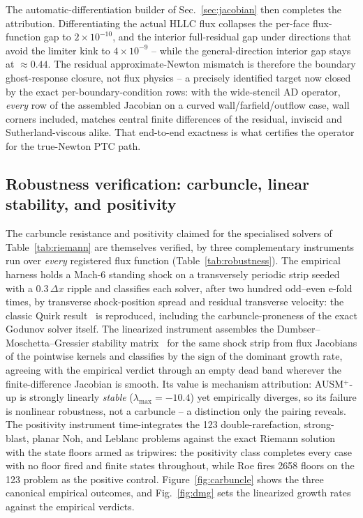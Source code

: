 \documentclass[journal,biblatex]{new-aiaa}
\begin{document}
The automatic-differentiation builder of Sec.~\ref{sec:jacobian} then completes the attribution. Differentiating the actual HLLC flux collapses the per-face flux-function gap to $2\times10^{-10}$, and the interior full-residual gap under directions that avoid the limiter kink to $4\times10^{-9}$ -- while the general-direction interior gap stays at $\approx0.44$. The residual approximate-Newton mismatch is therefore the boundary ghost-response closure, not flux physics -- a precisely identified target now closed by the exact per-boundary-condition rows: with the wide-stencil AD operator, \emph{every} row of the assembled Jacobian on a curved wall/farfield/outflow case, wall corners included, matches central finite differences of the residual, inviscid and Sutherland-viscous alike. That end-to-end exactness is what certifies the operator for the true-Newton PTC path.

\subsection{Robustness verification: carbuncle, linear stability, and positivity}
\label{sec:vv-robust}

The carbuncle resistance and positivity claimed for the specialised solvers of Table~\ref{tab:riemann} are themselves verified, by three complementary instruments run over \emph{every} registered flux function (Table~\ref{tab:robustness}). The empirical harness holds a Mach-6 standing shock on a transversely periodic strip seeded with a $0.3\,\Delta x$ ripple and classifies each solver, after two hundred odd--even e-fold times, by transverse shock-position spread and residual transverse velocity: the classic Quirk result~\cite{quirk_contribution_1994} is reproduced, including the carbuncle-proneness of the exact Godunov solver itself. The linearized instrument assembles the Dumbser--Moschetta--Gressier stability matrix~\cite{dumbser_matrix_2004} for the same shock strip from flux Jacobians of the pointwise kernels and classifies by the sign of the dominant growth rate, agreeing with the empirical verdict through an empty dead band wherever the finite-difference Jacobian is smooth. Its value is mechanism attribution: AUSM$^+$-up is strongly linearly \emph{stable} ($\lambda_{\max}=-10.4$) yet empirically diverges, so its failure is nonlinear robustness, not a carbuncle -- a distinction only the pairing reveals. The positivity instrument time-integrates the 123 double-rarefaction, strong-blast, planar Noh, and Leblanc problems against the exact Riemann solution with the state floors armed as tripwires: the positivity class completes every case with no floor fired and finite states throughout, while Roe fires 2658 floors on the 123 problem as the positive control. Figure~\ref{fig:carbuncle} shows the three canonical empirical outcomes, and Fig.~\ref{fig:dmg} sets the linearized growth rates against the empirical verdicts.
\end{document}
